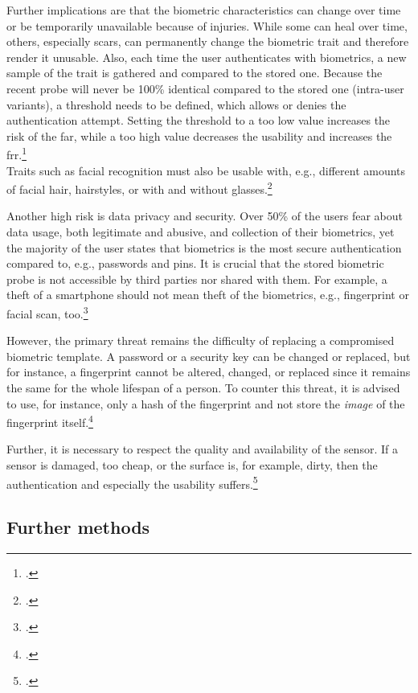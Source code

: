 Further implications are that the biometric characteristics can change over time or be temporarily unavailable because of injuries. While some can heal over time, others, especially scars, can permanently change the biometric trait and therefore render it unusable. Also, each time the user authenticates with biometrics, a new sample of the trait is gathered and compared to the stored one. Because the recent probe will never be 100\% identical compared to the stored one (\frqq intra-user variants\flqq), a threshold needs to be defined, which allows or denies the authentication attempt. Setting the threshold to a too low value increases the risk of the \gls{far}, while a too high value decreases the usability and increases the \gls{frr}.\footcite[See][13--17, 52]{Jain2011}\\Traits such as facial recognition must also be usable with, e.g., different amounts of facial hair, hairstyles, or with and without glasses.\footcite[See][98]{Jain2011}

Another high risk is data privacy and security. Over 50\% of the users fear about data usage, both legitimate and abusive, and collection of their biometrics, yet the majority of the user states that biometrics is the most secure authentication compared to, e.g., passwords and \glspl{pin}. It is crucial that the stored biometric probe is not accessible by third parties nor shared with them. For example, a theft of a smartphone should not mean theft of the biometrics, e.g., fingerprint or facial scan, too.\footcites[See][8]{ibm-security}

However, the primary threat remains the difficulty of replacing a compromised biometric template. A password or a security key can be changed or replaced, but for instance, a fingerprint cannot be altered, changed, or replaced since it remains the same for the whole lifespan of a person. To counter this threat, it is advised to use, for instance, only a hash of the fingerprint and not store the \textit{image} of the fingerprint itself.\footcites[See][266]{shostack2014threat}

Further, it is necessary to respect the quality and availability of the sensor. If a sensor is damaged, too cheap, or the surface is, for example, dirty, then the authentication and especially the usability suffers.\footcites[See][37]{265831}

\subsection{Further methods}

